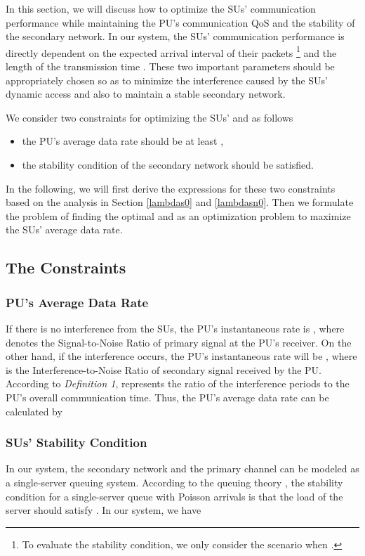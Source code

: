 \documentclass[11pt,draftcls]{IEEEtran}{\onecolumn}
\begin{document}
In this section, we will discuss how to optimize the SUs'
communication performance while maintaining the PU's communication
QoS and the stability of the secondary network. In our
system, the SUs' communication performance is directly dependent on
the expected arrival interval of their packets
\footnote{To evaluate the stability condition, we only
consider the scenario when .} and the length of
the transmission time . These two important parameters should
be appropriately chosen so as to minimize the interference caused by
the SUs' dynamic access and also to maintain a stable secondary
network.

We consider two constraints for optimizing the SUs'  and
 as follows
\begin{itemize}
\item the PU's average data rate should be at least ,
\item the stability condition of the secondary network should be satisfied.
\end{itemize}
In the following, we will first derive the expressions for these two
constraints based on the analysis in Section \ref{lambdas0} and
\ref{lambdasn0}. Then we formulate the problem of finding the
optimal  and  as an optimization problem
to maximize the SUs' average data rate.

\subsection{The Constraints}

\subsubsection{PU's Average Data Rate}
If there is no interference from the SUs, the PU's instantaneous
rate is , where 
denotes the Signal-to-Noise Ratio of primary signal at the PU's
receiver. On the other hand, if the interference occurs, the PU's
instantaneous rate will be
,
where  is the Interference-to-Noise Ratio of secondary
signal received by the PU. According to \emph{Definition 1},
 represents the ratio of the interference periods to the
PU's overall communication time. Thus, the PU's average data rate
 can be calculated by


\subsubsection{SUs' Stability Condition}\label{stability}
In our system, the secondary network and the primary channel can be
modeled as a single-server queuing system. According to the queuing
theory \cite{queuing}, the stability condition for a single-server
queue with Poisson arrivals is that the load of the server should
satisfy  \cite{32}. In our system, we have
\end{document}
